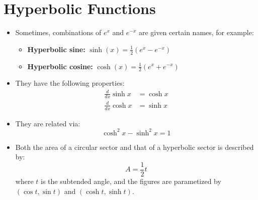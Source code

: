 \section{Hyperbolic Functions}
\begin{itemize}
    \item Sometimes, combinations of $e^x$ and $e^{-x}$ are given certain names, for example:
    \begin{itemize}
        \item \textbf{Hyperbolic sine:} $\sinh(x) = \frac{1}{2}(e^x-e^{-x})$
        \item \textbf{Hyperbolic cosine:} $\cosh(x) = \frac{1}{2}(e^x+e^{-x})$
    \end{itemize}
    \item They have the following properties:
    \begin{align}
        \frac{d}{dx} \sinh x &= \cosh x \\ 
        \frac{d}{dx} \cosh x &= \sinh x
    \end{align}
    \item They are related via:
    \begin{equation}
        \cosh^2 x - \sinh^2 x = 1
    \end{equation}
    \item Both the area of a circular sector and that of a hyperbolic sector is described by:
    \begin{equation}
        A = \frac{1}{2}t
    \end{equation}
    where $t$ is the subtended angle, and the figures are parametized by $(\cos t, \sin t)$ and $(\cosh t, \sinh t)$.
    \begin{center}
\end{center}
\end{itemize}
